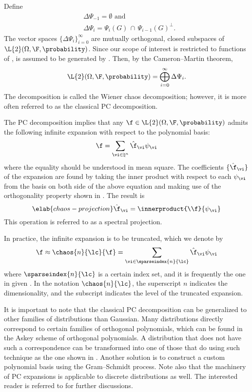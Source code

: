 Define
\begin{align*}
  & \Delta \Psi_{-1} = \emptyset \text{ and} \\
  & \Delta \Psi_i = \Psi_i(G) \, \cap \, \Psi_{i - 1}(G)^\perp.
\end{align*}
The vector spaces $\{ \Delta \Psi_i \}_{i = 0}^\infty$ are mutually orthogonal,
closed subspaces of $\L{2}(\Omega, \F, \probability)$. Since our scope of
interest is restricted to functions of \vx, \F is assumed to be generated by
\vx. Then, by the Cameron--Martin theorem,
\[
  \L{2}(\Omega, \F, \probability) = \bigoplus_{i = 0}^\infty \Delta \Psi_i.
\]
The decomposition is called the Wiener chaos decomposition; however, it is more
often referred to as the classical \ac{PC} decomposition.

The \ac{PC} decomposition implies that any $\f \in \L{2}(\Omega, \F,
\probability)$ admits the following infinite expansion with respect to the
polynomial basis:
\[
  \f = \sum_{\vi \in \natural^n} \hat{\f}_{\vi} \psi_{\vi}
\]
where the equality should be understood in mean square. The coefficients $\{
\hat{\f}_{\vi} \}$ of the expansion are found by taking the inner product with
respect to each $\psi_{\vi}$ from the basis on both side of the above equation
and making use of the orthogonality property shown in
. The result is
\begin{equation} \elab{chaos-projection}
  \hat{\f}_{\vi} = \innerproduct{\\f}{\psi_{\vi}}
\end{equation}
This operation is referred to as a spectral projection.

In practice, the infinite expansion is to be truncated, which we denote by
\[
  \f \approx \chaos{n}{\lc}{\f} = \sum_{\vi \in \sparseindex{n}{\lc}} \hat{\f}_{\vi} \psi_{\vi}
\]
where $\sparseindex{n}{\lc}$ is a certain index set, and it is frequently the
one in given . In the notation
$\chaos{n}{\lc}$, the superscript $n$ indicates the dimensionality, and the
subscript \lc indicates the level of the truncated expansion.

It is important to note that the classical \ac{PC} decomposition can be
generalized to other families of distributions than Gaussian. Many distributions
directly correspond to certain families of orthogonal polynomials, which can be
found in the Askey scheme of orthogonal polynomials. A distribution that does
not have such a correspondence can be transformed into one of those that do
using such technique as the one shown in .
Another solution is to construct a custom polynomial basis using the
Gram--Schmidt process. Note also that the machinery of \ac{PC} expansions is
applicable to discrete distributions as well. The interested reader is referred
to \cite{xiu2010} for further discussions.
